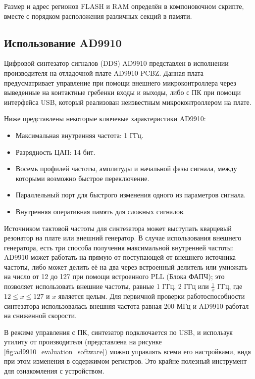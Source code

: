 \documentclass[rusmathsym, eqnumwithinsec, amspack, hyperref]{bomgost}
\begin{document}
Размер и адрес регионов FLASH и RAM определён в компоновочном скрипте, вместе с порядком расположения различных секций в памяти.

\subsection{Использование AD9910}

Цифровой синтезатор сигналов (DDS) AD9910 представлен в исполнении производителя на отладочной плате AD9910 PCBZ. Данная плата предусматривает управление при помощи внешнего микроконтроллера через выведенные на контактные гребенки входы и выходы, либо с ПК при помощи интерфейса USB, который реализован неизвестным микроконтроллером на плате.

Ниже представлены некоторые ключевые характеристики AD9910:

\begin{itemize}
	\item Максимальная внутренняя частота: 1 ГГц.
	\item Разрядность ЦАП: 14 бит.
	\item Восемь профилей частоты, амплитуды и начальной фазы сигнала, между которыми возможно быстрое переключение.
	\item Параллельный порт для быстрого изменения одного из параметров сигнала.
	\item Внутренняя оперативная память для сложных сигналов.
\end{itemize}

Источником тактовой частоты для синтезатора может выступать кварцевый резонатор на плате или внешний генератор. В случае использования внешнего генератора, есть три способа получения максимальной внутренней частоты: AD9910 может работать на прямую от поступающей от внешнего источника частоты, либо может делить её на два через встроенный делитель или умножать на число от 12 до 127 при помощи встроенного PLL (Блока ФАПЧ); это позволяет использовать внешние частоты, равные 1 ГГц, 2 ГГц или $\frac{1}{x}$ ГГц, где $12 \leq x \leq 127$ и $x$ является целым. Для первичной проверки работоспособности синтезатора использовалась внешняя частота равная 200 МГц и AD9910 работал на сниженной скорости.

В режиме управления с ПК, синтезатор подключается по USB, и используя утилиту от производителя (представлена на рисунке \ref{fig:ad9910_evaluation_software}) можно управлять всеми его настройками, видя при этом изменения в содержимом регистров. Это крайне полезный инструмент для ознакомления с устройством.
\end{document}
